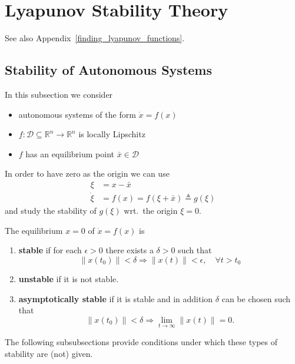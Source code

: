 \section{Lyapunov Stability Theory}
See also Appendix~\ref{finding_lyapunov_functions}.
\subsection{Stability of Autonomous Systems}
In this subsection we consider
\begin{itemize}
    \item autonomous systems of the form $\dot{x} = f(x)$
    \item $f:\mathcal{D}\subseteq \mathbb{R}^n\to \mathbb{R}^n$ is locally Lipschitz
    \item $f$ has an equilibrium point $\bar{x}\in \mathcal{D}$
\end{itemize}

\newpar{}

In order to have zero as the origin we can use
\begin{align*}
    \xi       & = x-\bar{x}                                \\
    \dot{\xi} & = f(x) = f(\xi + \bar{x})\triangleq g(\xi)
\end{align*}
and study the stability of $g(\xi)$ wrt.\ the origin $\xi=0$.

\newpar{}

The equilibrium $x=0$ of $\dot{x}=f(x)$ is
\begin{enumerate}
    \item \textbf{stable} if for each $\epsilon > 0$ there exists a $\delta > 0$ such that
          \begin{equation*}
              \|x(t_0)\| < \delta \Rightarrow \|x(t)\| < \epsilon , \quad \forall t > t_0
          \end{equation*}
    \item \textbf{unstable} if it is not stable.
    \item \textbf{asymptotically stable} if it is stable and in addition $\delta$ can be chosen such that
          \begin{equation*}
              \|x(t_0)\| < \delta \Rightarrow \lim_{t \to \infty}\|x(t)\| = 0.
          \end{equation*}
\end{enumerate}
The following subsubsections provide conditions under which these types of stability are (not) given.

